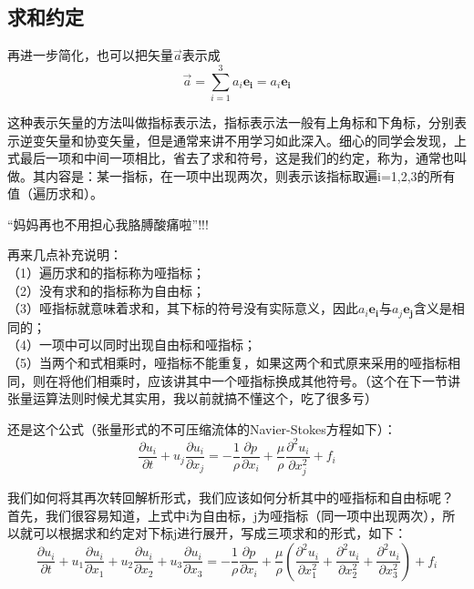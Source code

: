 \documentclass{ctexart}
\begin{document}
\subsection{求和约定}
\begin{注意}
    再进一步简化，也可以把矢量$\vec{a}$表示成
    $$ \vec{a} = \sum_{i=1}^{3}a_i \boldsymbol{e_i}= a_i \boldsymbol{e_i}$$
    \par
    这种表示矢量的方法叫做指标表示法，指标表示法一般有上角标和下角标，分别表示逆变矢量和协变矢量，但是通常来讲不用学习如此深入。细心的同学会发现，上式最后一项和中间一项相比，省去了求和符号，这是我们的约定，称为，通常也叫做。其内容是：某一指标，在一项中出现两次，则表示该指标取遍i=1,2,3的所有值（遍历求和）。
    \par
    “妈妈再也不用担心我胳膊酸痛啦”!!!
    \par
    再来几点补充说明：\\
    （1）遍历求和的指标称为哑指标；\\
    （2）没有求和的指标称为自由标；\\
    （3）哑指标就意味着求和，其下标的符号没有实际意义，因此$a_i\boldsymbol{e_i}$与$a_j\boldsymbol{e_j}$含义是相同的；\\
    （4）一项中可以同时出现自由标和哑指标；\\
    （5）当两个和式相乘时，哑指标不能重复，如果这两个和式原来采用的哑指标相同，则在将他们相乘时，应该讲其中一个哑指标换成其他符号。（这个在下一节讲张量运算法则时候尤其实用，我以前就搞不懂这个，吃了很多亏）
    
\end{注意}
    还是这个公式（张量形式的不可压缩流体的Navier-Stokes方程如下）：
    $$
    \frac{\partial u_{i}}{\partial t}+u_{j} \frac{\partial u_{i}}{\partial x_{j}}=-\frac{1}{\rho} \frac{\partial p}{\partial x_{i}}+\frac{\mu}{\rho} \frac{\partial^{2} u_{i}}{\partial x_{j}^{2}}+f_{i}
    $$
    \par
    我们如何将其再次转回解析形式，我们应该如何分析其中的哑指标和自由标呢？
    首先，我们很容易知道，上式中i为自由标，j为哑指标（同一项中出现两次），所以就可以根据求和约定对下标j进行展开，写成三项求和的形式，如下：
    $$
    \frac{\partial u_{i}}{\partial t}+u_{1} \frac{\partial u_{i}}{\partial x_{1}}+u_{2} \frac{\partial u_{i}}{\partial x_{2}}+u_{3} \frac{\partial u_{i}}{\partial x_{3}}
    =-\frac{1}{\rho} \frac{\partial p}{\partial x_{i}}+\frac{\mu}{\rho}\left(\frac{\partial^{2} u_{i}}{\partial x_{1}^{2}}+\frac{\partial^{2} u_{i}}{\partial x_{2}^{2}}+\frac{\partial^{2} u_{i}}{\partial x_{3}^{2}}\right)+f_{i}
    $$
\end{document}
